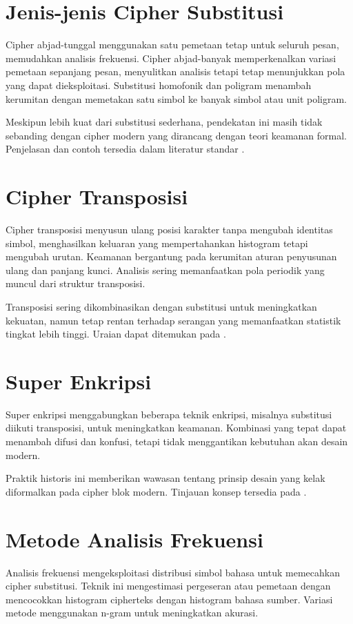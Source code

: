 \documentclass[../main.tex]{subfiles}
\begin{document}
\section{Jenis-jenis Cipher Substitusi}
Cipher abjad-tunggal menggunakan satu pemetaan tetap untuk seluruh pesan, memudahkan analisis frekuensi. Cipher abjad-banyak memperkenalkan variasi pemetaan sepanjang pesan, menyulitkan analisis tetapi tetap menunjukkan pola yang dapat dieksploitasi. Substitusi homofonik dan poligram menambah kerumitan dengan memetakan satu simbol ke banyak simbol atau unit poligram.

Meskipun lebih kuat dari substitusi sederhana, pendekatan ini masih tidak sebanding dengan cipher modern yang dirancang dengan teori keamanan formal. Penjelasan dan contoh tersedia dalam literatur standar \parencite{menezes1996handbook}.

\section{Cipher Transposisi}
Cipher transposisi menyusun ulang posisi karakter tanpa mengubah identitas simbol, menghasilkan keluaran yang mempertahankan histogram tetapi mengubah urutan. Keamanan bergantung pada kerumitan aturan penyusunan ulang dan panjang kunci. Analisis sering memanfaatkan pola periodik yang muncul dari struktur transposisi.

Transposisi sering dikombinasikan dengan substitusi untuk meningkatkan kekuatan, namun tetap rentan terhadap serangan yang memanfaatkan statistik tingkat lebih tinggi. Uraian dapat ditemukan pada \textcite{menezes1996handbook}.

\section{Super Enkripsi}
Super enkripsi menggabungkan beberapa teknik enkripsi, misalnya substitusi diikuti transposisi, untuk meningkatkan keamanan. Kombinasi yang tepat dapat menambah difusi dan konfusi, tetapi tidak menggantikan kebutuhan akan desain modern.

Praktik historis ini memberikan wawasan tentang prinsip desain yang kelak diformalkan pada cipher blok modern. Tinjauan konsep tersedia pada \textcite{menezes1996handbook}.

\section{Metode Analisis Frekuensi}
Analisis frekuensi mengeksploitasi distribusi simbol bahasa untuk memecahkan cipher substitusi. Teknik ini mengestimasi pergeseran atau pemetaan dengan mencocokkan histogram cipherteks dengan histogram bahasa sumber. Variasi metode menggunakan n-gram untuk meningkatkan akurasi.
\end{document}
